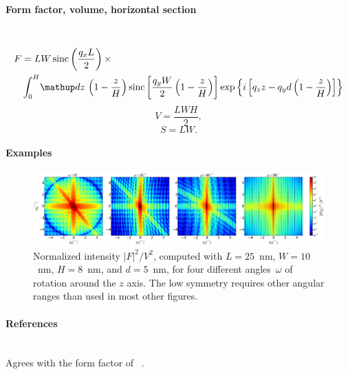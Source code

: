 \paragraph{Form factor, volume, horizontal section}\strut\\
\begin{align*}
F &=L W
\sinc\left(\frac{q_xL}{2}\right)\times \\ &
\int_0^H \!\d z\,
\left(1-\frac{z}{H}\right)
 \sinc\left[\frac{q_y
    W}{2}\left(1-\frac{z}{H}\right)\right]
\exp\left\{ i\left[q_zz -
    q_yd\left(1-\frac{z}{H}\right)\right]\right\}
\end{align*}
\begin{equation*}
  V = \dfrac{L W H}{2},
\end{equation*}
\begin{equation*}
  S = L W.
\end{equation*}

\paragraph{Examples}\strut

\begin{figure}[H]
\begin{center}
\includegraphics[width=\textwidth]{fig/ff2/ff_Ripple2.pdf}
\end{center}
\caption{Normalized intensity $|F|^2/V^2$,
computed with $L=25$~nm, $W=10$~nm, $H=8$~nm, and $d=5$~nm,
for four different angles~$\omega$ of rotation around the $z$ axis.
The low symmetry requires other angular ranges than used in most other figures.}
\end{figure}

\paragraph{References}\strut\\
Agrees with the  form factor of \FitGISAXS\ \cite{Bab13}.


 \label{STetrahedron}

